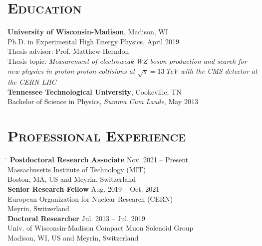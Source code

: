 \documentclass[10pt]{res} %
\begin{document}

\address{{\bf Current Address} \\  CERN B40/2-A20 \\  Geneva 23 \\ Switzerland \\ Tel: +41 77 501 95 13 }
\address{}

\begin{resume}
\section{\textsc{Education}}
  \textbf{University of Wisconsin-Madison}, Madison, WI \\
Ph.D. in Experimental High Energy Physics, April 2019 \\
  Thesis advisor: Prof. Matthew Herndon \\
    Thesis topic: \emph{Measurement of electroweak WZ boson production and search for new physics in proton-proton collisions at $\sqrt{s}=13$\,TeV with the CMS detector at the CERN LHC} \\
  \textbf{Tennessee Technological University}, Cookeville, TN \\
Bachelor of Science in Physics, \textit{Summa Cum Laude}, May 2013

\section{\textsc{Professional Experience}}
\vspace{-0.1in}
\begin{tabbing}
\hspace{2.3in}\= \hspace{2.4in}\= \kill %
{\bf Postdoctoral Research Associate} \>\> Nov. 2021 -- Present \\
Massachusetts Institute of Technology (MIT)   \\  Boston, MA, US and Meyrin, Switzerland \\
{\bf Senior Research Fellow} \>\> Aug. 2019 -- Oct. 2021 \\
European Organization for Nuclear Research (CERN)   \\  Meyrin, Switzerland \\
{\bf Doctoral Researcher} \>\> Jul. 2013 -- Jul. 2019\\
Univ. of Wisconsin-Madison Compact Muon Solenoid Group \\  Madison, WI, US and Meyrin, Switzerland \\
\end{tabbing}\vspace{-20pt}      %


\end{resume}
\end{document}
